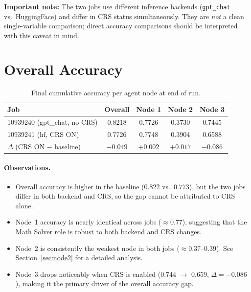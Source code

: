 \documentclass[11pt]{article}
\begin{document}
\noindent\textbf{Important note:} The two jobs use different inference backends
(\texttt{gpt\_chat} vs.\ HuggingFace) and differ in CRS status simultaneously.
They are \emph{not} a clean single-variable comparison; direct accuracy
comparisons should be interpreted with this caveat in mind.

\section{Overall Accuracy}

\begin{table}[h]
\centering
\caption{Final cumulative accuracy per agent node at end of run.}
\label{tab:overall_acc}
\begin{tabular}{lcccc}
\toprule
\textbf{Job} & \textbf{Overall} & \textbf{Node 1} & \textbf{Node 2} & \textbf{Node 3} \\
\midrule
10939240 (gpt\_chat, no CRS) & 0.8218 & 0.7726 & 0.3730 & 0.7445 \\
10939241 (hf, CRS ON)        & 0.7726 & 0.7748 & 0.3904 & 0.6588 \\
\midrule
$\Delta$ (CRS ON $-$ baseline) & $-0.049$ & $+0.002$ & $+0.017$ & $-0.086$ \\
\bottomrule
\end{tabular}
\end{table}

\paragraph{Observations.}
\begin{itemize}
  \item Overall accuracy is higher in the baseline (0.822 vs.\ 0.773), but the
        two jobs differ in both backend and CRS, so the gap cannot be attributed
        to CRS alone.
  \item Node~1 accuracy is nearly identical across jobs ($\approx$0.77),
        suggesting that the Math Solver role is robust to both backend and CRS
        changes.
  \item Node~2 is consistently the weakest node in both jobs ($\approx$0.37--0.39).
        See Section~\ref{sec:node2} for a detailed analysis.
  \item Node~3 drops noticeably when CRS is enabled (0.744 $\to$ 0.659,
        $\Delta = -0.086$), making it the primary driver of the overall
        accuracy gap.
\end{itemize}
\end{document}
